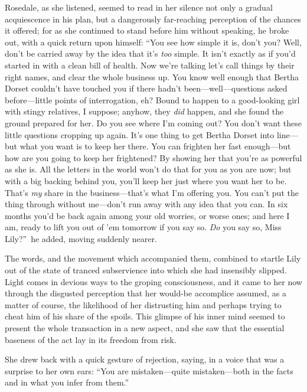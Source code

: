\documentclass[12pt,a4paper]{book}
\begin{document}
Rosedale, as she listened, seemed to read in her silence not only
a gradual acquiescence in his plan, but a dangerously far-reaching perception of the chances it offered; for as she
continued to stand before him without speaking, he broke out,
with a quick return upon himself: ``You see how simple it is,
don't you? Well, don't be carried away by the idea that it's \textit{too} simple. 
It isn't exactly as if you'd started in with a clean
bill of health. Now we're talking let's call things by
their right names, and clear the whole business up. You know well
enough that Bertha Dorset couldn't have touched you if there
hadn't been---well---questions asked before---little points of
interrogation, eh? Bound to happen to a good-looking girl with
stingy relatives, I suppose; anyhow, they \textit{did} happen, and she
found the ground prepared for her. Do you see where I'm coming
out? You don't want these little questions cropping up again. 
It's one thing to get Bertha Dorset into line---but what you want
is to keep her there. You can frighten her fast enough---but how
are you going to keep her frightened? By showing her that you're
as powerful as she is. All the letters in the world won't do that
for you as you are now; but with a big backing behind you, you'll
keep her just where you want her to be. That's \textit{my} share in the
business---that's what I'm offering you. You can't put the thing
through without me---don't run away with any idea that you can. In
six months you'd be back again among your old worries, or worse
ones; and here I am, ready to lift you out of 'em tomorrow if you
say so. \textit{Do} you say so, Miss Lily?''\ he added, moving suddenly
nearer.





The words, and the movement which accompanied them, combined to
startle Lily out of the state of tranced subservience into which
she had insensibly slipped. Light comes in devious ways to the
groping consciousness, and it came to her now through the
disgusted perception that her would-be accomplice assumed, as a
matter of course, the likelihood of her distrusting him and
perhaps trying to cheat him of his share of the spoils. This
glimpse of his inner mind seemed to present the whole transaction
in a new aspect, and she saw that the essential baseness of the
act lay in its freedom from risk.





She drew back with a quick gesture of rejection, saying, in a
voice that was a surprise to her own ears: ``You are
mistaken---quite mistaken---both in the facts and in what you infer
from them.''
\end{document}
